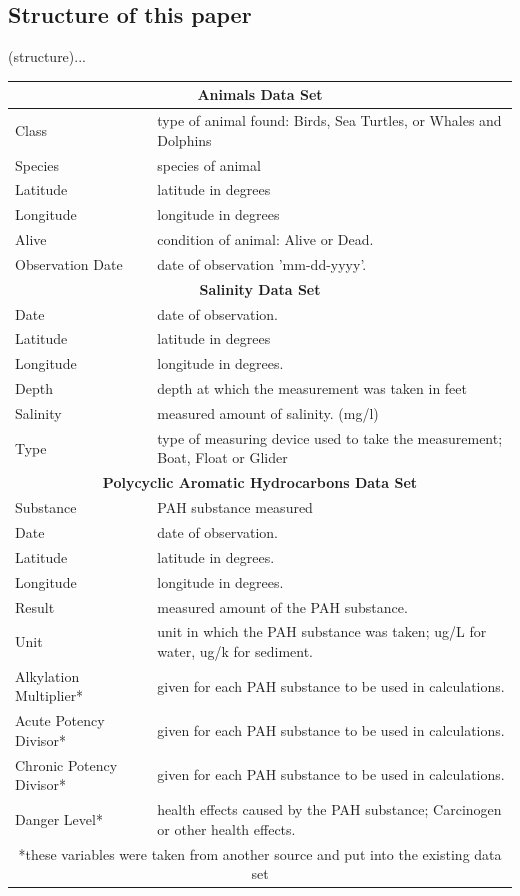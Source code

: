 \documentclass[authoryear,12pt]{elsarticle}
\begin{document}
\subsection{Structure of this paper}
(structure)...
\begin{center}
\begin{tabular}{| l | p{11cm} | }
\hline
\multicolumn{2}{|c|}{{\bf Animals Data Set}} \\ \hline
Class & type of animal found: Birds, Sea Turtles, or Whales and Dolphins \\ \hline
Species & species of animal \\ \hline
Latitude & latitude in degrees  \\ \hline
Longitude & longitude in degrees\\ \hline
Alive & condition of animal: Alive or Dead. \\ \hline
Observation Date & date of observation 'mm-dd-yyyy'. \\ \hline
\multicolumn{2}{|c|}{{\bf Salinity Data Set}} \\ \hline
Date & date of observation. \\ \hline
Latitude & latitude in degrees \\ \hline
Longitude & longitude in degrees. \\ \hline
Depth & depth at which the measurement was taken in feet \\ \hline
Salinity &  measured amount of salinity. (mg/l) \\ \hline
Type &  type of measuring device used to take the measurement; Boat, Float or Glider \\ \hline
\multicolumn{2}{|c|}{{\bf Polycyclic Aromatic Hydrocarbons Data Set}} \\ \hline
Substance & PAH substance measured \\ \hline
Date & date of observation.\\ \hline
Latitude & latitude in degrees. \\ \hline
Longitude & longitude in degrees. \\ \hline
Result &  measured amount of the PAH substance. \\ \hline
Unit &  unit in which the PAH substance was taken; ug/L for water, ug/k for sediment. \\ \hline
Alkylation Multiplier* & given for each PAH substance to be used in calculations. \\ \hline
Acute Potency Divisor* &  given for each PAH substance to be used in calculations. \\ \hline
Chronic Potency Divisor* &  given for each PAH substance to be used in calculations. \\ \hline
Danger Level* &  health effects caused by the PAH substance; Carcinogen or other health effects. \\ \hline
\multicolumn{2}{|c|}{*these variables were taken from another source and put into the existing data set} \\ \hline
\end{tabular}
\end{center}
\end{document}
